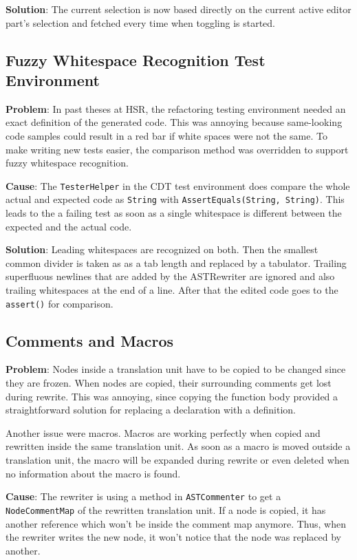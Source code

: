 \textbf{Solution}: The current selection is now based directly on the current 
active editor part's selection and fetched every time when toggling is started.

\subsection{Fuzzy Whitespace Recognition Test Environment}

\textbf{Problem}: 
In past theses at HSR, the refactoring testing environment needed an exact
definition of the generated code. This was annoying because same-looking code
samples could result in a red bar if white spaces were not the same. To make
writing new tests easier, the comparison method was overridden to support fuzzy
whitespace recognition.

\textbf{Cause}: The \texttt{TesterHelper} in the CDT test environment does
compare the whole actual and expected code as \texttt{String} with \cite{JUnit}
\texttt{AssertEquals(String, String)}. This leads to the a failing test as
soon as a single whitespace is different between the expected and the actual
code.

\textbf{Solution}: Leading whitespaces are recognized on both. Then the smallest
common divider is taken as as a tab length and replaced by a tabulator. Trailing
superfluous newlines that are added by the ASTRewriter are ignored and also
trailing whitespaces at the end of a line. After that the edited code goes to
the \texttt{assert()} for comparison.

\subsection{Comments and Macros}
\textbf{Problem}: Nodes inside a translation unit have to be copied to be 
changed since they are frozen. When nodes are copied, their surrounding comments 
get lost during rewrite\cite{Sommerlad:2008:RCR:1449814.1449817}. This was
annoying, since copying the function body provided a straightforward solution
for replacing a declaration with a definition.

Another issue were macros. Macros are working perfectly when copied and 
rewritten inside the same translation unit. As soon as a macro is moved outside 
a translation unit, the macro will be expanded during rewrite or even
deleted when no information about the macro is found.

\textbf{Cause}: The rewriter is using a method in \texttt{ASTCommenter} to get a 
\texttt{NodeCommentMap} of the rewritten translation unit. If a node is copied, 
it has another reference which won't be inside the comment map anymore. Thus, 
when the rewriter writes the new node, it won't notice that the node was 
replaced by another.

